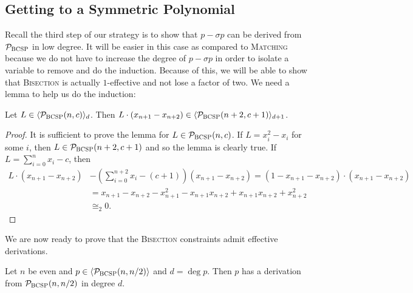 \subsection{Getting to a Symmetric Polynomial}
Recall the third step of our strategy is to show that $p - \sigma p$ can be derived from $\mathcal P_{\textsc{BCSP}}$ in low degree. It will be easier in this case as compared to \textsc{Matching} because we do not have to increase the degree of $p - \sigma p$ in order to isolate a variable to remove and do the induction. Because of this, we will be able to show that \textsc{Bisection} is actually $1$-effective and not lose a factor of two.
We need a lemma to help us do the induction:
\begin{lemma}\label{lem:bcsp-induct}
Let $L \in \langle \mathcal P_{\textsc{BCSP}}(n,c) \rangle_d$. Then $L\cdot (x_{n+1} - x_{n+2}) \in \langle \mathcal P_{\textsc{BCSP}}(n+2,c+1) \rangle_{d+1}$.
\end{lemma}
\begin{proof}
It is sufficient to prove the lemma for $L \in \mathcal P_{\textsc{BCSP}}(n,c)$. If $L = x_i^2 - x_i$ for some $i$, then $L \in \mathcal P_{\textsc{BCSP}}(n+2,c+1)$ and so the lemma is clearly true. If $L = \sum_{i=0}^n x_i - c$, then 
\begin{align*}
L\cdot (x_{n+1} - x_{n+2}) &- \left(\sum_{i=0}^{n+2} x_i - (c+1)\right)(x_{n+1} - x_{n+2}) = (1-x_{n+1} - x_{n+2}) \cdot (x_{n+1} - x_{n+2}) \\
&= x_{n+1} - x_{n+2} - x_{n+1}^2 - x_{n+1}x_{n+2} + x_{n+1}x_{n+2} + x_{n+2}^2 \\
&\cong_2 0.
\end{align*} 
\end{proof}
We are now ready to prove that the \textsc{Bisection} constraints admit effective derivations.
\begin{theorem}\label{thm:bisec-effective}
Let $n$ be even and $p \in \langle \mathcal P_{\textsc{BCSP}}(n,n/2) \rangle$ and $d = \deg p$. Then $p$ has a derivation from $\mathcal P_{\textsc{BCSP}}(n,n/2)$ in degree $d$. 
\end{theorem}
